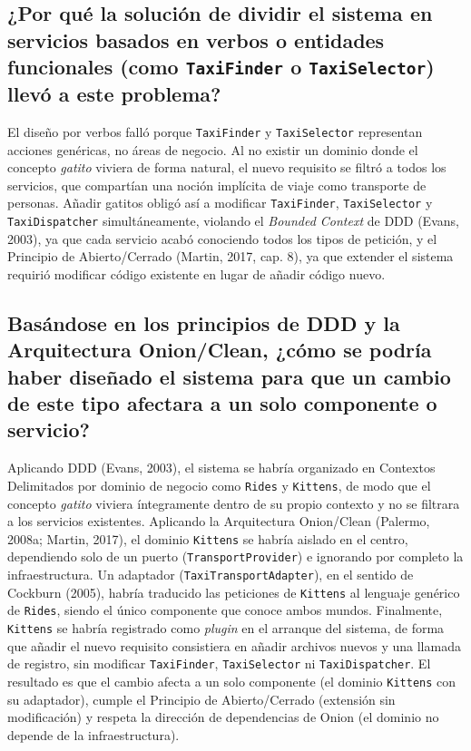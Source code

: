 \documentclass[11pt,a4paper]{article}
\begin{document}
\subsection*{¿Por qué la solución de dividir el sistema en servicios basados en verbos o entidades funcionales (como \texttt{TaxiFinder} o \texttt{TaxiSelector}) llevó a este problema?}

El diseño por verbos falló porque \texttt{TaxiFinder} y \texttt{TaxiSelector} representan
acciones genéricas, no áreas de negocio. Al no existir un dominio donde el concepto
\emph{gatito} viviera de forma natural, el nuevo requisito se filtró a todos los servicios, que
compartían una noción implícita de viaje como transporte de personas. Añadir gatitos obligó así
a modificar \texttt{TaxiFinder}, \texttt{TaxiSelector} y \texttt{TaxiDispatcher}
simultáneamente, violando el \emph{Bounded Context} de DDD (Evans, 2003), ya que cada servicio
acabó conociendo todos los tipos de petición, y el Principio de Abierto/Cerrado (Martin, 2017,
cap. 8), ya que extender el sistema requirió modificar código existente en lugar de añadir
código nuevo.

\subsection*{Basándose en los principios de DDD y la Arquitectura Onion/Clean, ¿cómo se podría haber diseñado el sistema para que un cambio de este tipo afectara a un solo componente o servicio?}

Aplicando DDD (Evans, 2003), el sistema se habría organizado en Contextos Delimitados por
dominio de negocio
como \texttt{Rides} y \texttt{Kittens}, de modo que el concepto \emph{gatito} viviera
íntegramente dentro de su propio contexto y no se filtrara a los servicios existentes.
Aplicando la Arquitectura Onion/Clean (Palermo, 2008a; Martin, 2017), el dominio
\texttt{Kittens} se habría aislado en el centro, dependiendo solo de un puerto
(\texttt{TransportProvider}) e ignorando por completo la infraestructura. Un adaptador
(\texttt{TaxiTransportAdapter}), en el sentido de Cockburn (2005), habría traducido las peticiones
de \texttt{Kittens} al lenguaje genérico de \texttt{Rides}, siendo el único componente que
conoce ambos mundos. Finalmente, \texttt{Kittens} se habría registrado como \emph{plugin} en el
arranque del sistema, de forma que añadir el nuevo requisito consistiera en añadir archivos
nuevos y una llamada de registro, sin modificar \texttt{TaxiFinder}, \texttt{TaxiSelector} ni
\texttt{TaxiDispatcher}. El resultado es que el cambio afecta a un solo componente (el dominio
\texttt{Kittens} con su adaptador), cumple el Principio de Abierto/Cerrado (extensión sin
modificación) y respeta la dirección de dependencias de Onion (el dominio no depende de la
infraestructura).
\end{document}
